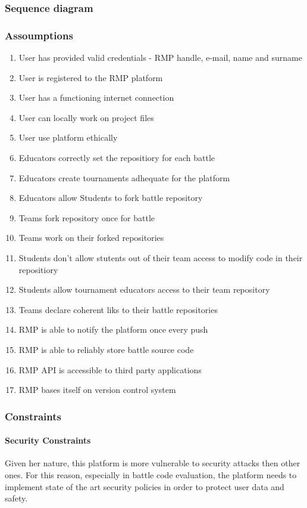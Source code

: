 \subsubsection{Sequence diagram}
\subsubsection{Assoumptions}
\begin{enumerate}[label=$\bullet$ \textbf{D\arabic*:}]
    \item User has provided valid credentials - RMP handle, e-mail, name and surname
    \item User is registered to the RMP platform
    \item User has a functioning internet connection
    \item User can locally work on project files
    \item User use platform ethically
    \item Educators correctly set the repositiory for each battle
    \item Educators create tournaments adhequate for the platform
    \item Educators allow Students to fork battle repository
    \item Teams fork repository once for battle
    \item Teams work on their forked repositories
    \item Students don't allow stutents out of their team access to modify code in their repositiory
    \item Students allow tournament educators access to their team repository
    \item Teams declare coherent liks to their battle repositories
    \item RMP is able to notify the platform once every push
    \item RMP is able to reliably store battle source code
    \item RMP API is accessible to third party applications
    \item RMP bases itself on version control system
\end{enumerate}
\subsubsection{Constraints}
\paragraph{Security Constraints}
Given her nature, this platform is more vulnerable to security attacks then other ones. For this reason, especially in battle code evaluation, the platform needs to implement state of the art security policies in order to protect user data and safety.
